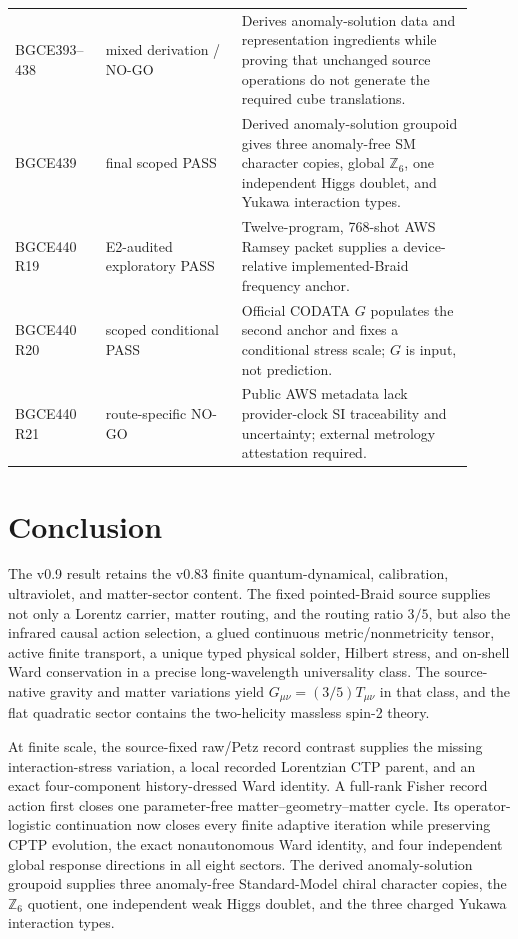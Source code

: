 \documentclass[11pt]{article}
\theoremstyle{definition}
\theoremstyle{remark}
\begin{document}
\begin{longtable}{>{\raggedright\arraybackslash}p{0.18\linewidth} >{\raggedright\arraybackslash}p{0.27\linewidth} >{\raggedright\arraybackslash}p{0.46\linewidth}}
BGCE393--438 & mixed derivation / NO-GO & Derives anomaly-solution data and representation ingredients while proving that unchanged source operations do not generate the required cube translations. \\
BGCE439 & final scoped PASS & Derived anomaly-solution groupoid gives three anomaly-free SM character copies, global $\mathbb Z_6$, one independent Higgs doublet, and Yukawa interaction types. \\
BGCE440 R19 & E2-audited exploratory PASS & Twelve-program, 768-shot AWS Ramsey packet supplies a device-relative implemented-Braid frequency anchor. \\
BGCE440 R20 & scoped conditional PASS & Official CODATA $G$ populates the second anchor and fixes a conditional stress scale; $G$ is input, not prediction. \\
BGCE440 R21 & route-specific NO-GO & Public AWS metadata lack provider-clock SI traceability and uncertainty; external metrology attestation required. \\
\bottomrule
\end{longtable}

\section{Conclusion}

The v0.9 result retains the v0.83 finite quantum-dynamical, calibration, ultraviolet, and matter-sector content. The fixed pointed-Braid source supplies not only a Lorentz carrier, matter routing, and the routing ratio $3/5$, but also the infrared causal action selection, a glued continuous metric/nonmetricity tensor, active finite transport, a unique typed physical solder, Hilbert stress, and on-shell Ward conservation in a precise long-wavelength universality class. The source-native gravity and matter variations yield $G_{\mu\nu}=(3/5)T_{\mu\nu}$ in that class, and the flat quadratic sector contains the two-helicity massless spin-2 theory.

At finite scale, the source-fixed raw/Petz record contrast supplies the missing interaction-stress variation, a local recorded Lorentzian CTP parent, and an exact four-component history-dressed Ward identity. A full-rank Fisher record action first closes one parameter-free matter--geometry--matter cycle. Its operator-logistic continuation now closes every finite adaptive iteration while preserving CPTP evolution, the exact nonautonomous Ward identity, and four independent global response directions in all eight sectors. The derived anomaly-solution groupoid supplies three anomaly-free Standard-Model chiral character copies, the $\mathbb Z_6$ quotient, one independent weak Higgs doublet, and the three charged Yukawa interaction types.
\end{document}
